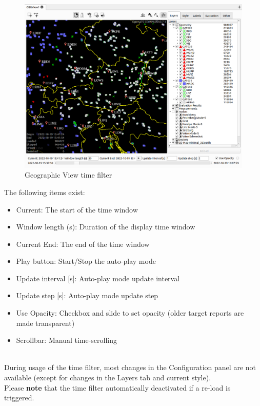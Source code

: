 \begin{figure}[H]
    \hspace*{-2.5cm}
    \includegraphics[width=19cm,frame]{figures/geoview_time_filter.png}
  \caption{Geographic View time filter}
  \label{fig:geoview_time_filter}
\end{figure}

The following items exist:

\begin{itemize}
 \item Current: The start of the time window
 \item Window length (s): Duration of the display time window
 \item Current End: The end of the time window
 \item Play button: Start/Stop the auto-play mode
 \item Update interval [s]: Auto-play mode update interval
 \item Update step [s]: Auto-play mode update step
 \item Use Opacity: Checkbox and slide to set opacity (older target reports are made transparent)
 \item Scrollbar: Manual time-scrolling
\end{itemize}
\ \\

During usage of the time filter, most changes in the Configuration panel are not available (except for changes in the Layers tab and current style). \\

Please \textbf{note} that the time filter automatically deactivated if a re-load is triggered.

